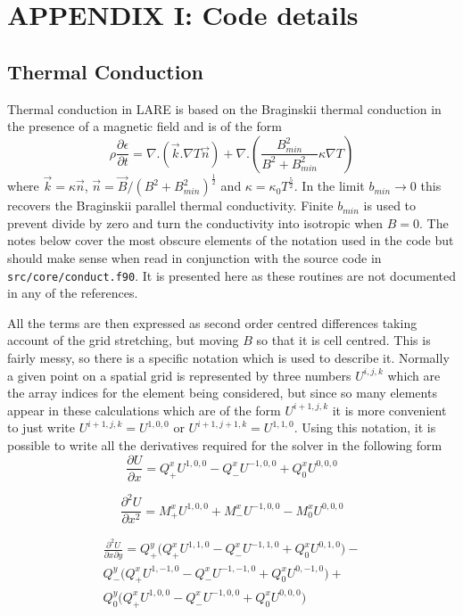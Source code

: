 \documentclass[11pt]{article}
\begin{document}
\newpage
\section*{ APPENDIX I: Code details}
\subsection*{Thermal Conduction} %
\label{sec:thermal_code}  

Thermal conduction in LARE is based on the Braginskii thermal conduction in the presence of a magnetic field and is of the form\\
\[
\rho \frac{\partial \epsilon}{\partial t} = \nabla . \left(\vec{k} . \nabla T \vec{n} \right) +  \nabla . \left(  \frac{B_{min}^2}{B^2+B_{min}^2} \kappa \nabla T \right)
\]
where $\vec{k} = \kappa \vec{n}$, $\vec{n} = \vec{B}/(B^2+B_{min}^2)^\frac{1}{2}$ and $\kappa = \kappa_0  T^\frac{5}{2}$. In the limit $b_{min}\to 0$ this recovers the Braginskii parallel thermal conductivity. Finite $b_{min}$ is used to prevent divide by zero and turn the conductivity into isotropic when $B=0$. The notes below cover the most obscure elements of the notation used in the code but should make sense when read in conjunction with the source code in {\tt src/core/conduct.f90}. It is presented here as these routines are not documented in any of the references.

All the terms are then expressed as second order centred differences taking account of the grid stretching, but moving $B$ so that it is cell centred. This is fairly messy, so there is a specific notation which is used to describe it. Normally a given point on a spatial grid is represented by three numbers $U^{i,j,k}$ which are the array indices for the element being considered, but since so many elements appear in these calculations which are of the form $U^{i+1,j,k}$ it is more convenient to just write $U^{i+1,j,k}=U^{1,0,0}$ or $U^{i+1,j+1,k}=U^{1,1,0}$. Using this notation, it is possible to write all the derivatives required for the solver in the following form\\
\[
\frac{\partial U}{\partial x} = Q^x_+ U^{1,0,0} - Q^x_- U^{-1,0,0} + Q^x_0 U^{0,0,0}    
\]

\[
\frac{\partial^2 U}{\partial x^2} = M^x_+ U^{1,0,0} + M^x_- U^{-1,0,0} - M^x_0 U^{0,0,0}
\]

\begin{eqnarray*}
  \frac{\partial^2 U}{\partial x \partial y} = Q^y_+\bigl(Q^x_+U^{1,1,0} - Q^x_- U^{-1,1,0} + Q^x_0 U^{0,1,0} \bigr) -\\
  Q^y_-\bigl(Q^x_+U^{1,-1,0} - Q^x_- U^{-1,-1,0} + Q^x_0 U^{0,-1,0} \bigr) +\\
  Q^y_0\bigl(Q^x_+U^{1,0,0} - Q^x_- U^{-1,0,0} + Q^x_0 U^{0,0,0} \bigr)  
\end{eqnarray*}
\end{document}
